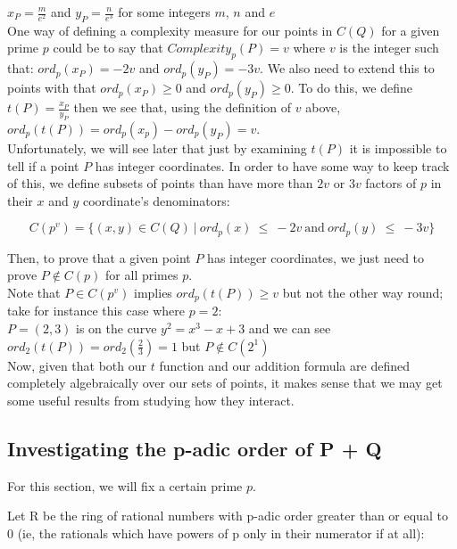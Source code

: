 \documentclass{article}
\begin{document}
$x_P = \frac{m}{e^2}$ \quad and \quad $y_P = \frac{n}{e^3}$ for some integers $m$, $n$ and $e$\\

One way of defining a complexity measure for our points in $C(Q)$ for a given prime $p$ could be to say that $Complexity_p(P) = v$ where $v$ is the integer such that:  $ord_p(x_P) = -2v$ and $ord_p(y_P) = -3v$. We also need to extend this to points with that $ord_p(x_P) \geq 0$ and $ord_p(y_P) \geq 0$. To do this, we define $t(P) = \frac{x_P}{y_P}$ then we see that, using the definition of $v$ above, $ord_p(t(P)) = ord_p(x_p) - ord_p(y_P) = v$. \\ 

Unfortunately, we will see later that just by examining $t(P)$ it is impossible to tell if a point $P$ has integer coordinates. In order to have some way to keep track of this, we define subsets of points than have more than $2v$ or $3v$ factors of $p$ in their $x$ and $y$ coordinate's denominators:

\[ C(p^v) = \{(x, y) \in C(Q) \ | \ ord_p(x) \ \leq \ -2v \ \text{and} \ ord_p(y) \ \leq \ -3v\} \]

Then, to prove that a given point $P$ has integer coordinates, we just need to prove $P \notin C(p)$ for all primes $p$.\\

Note that $P \in C(p^v)$ implies $ord_p(t(P)) \geq v$ but not the other way round; take for instance this case where $p = 2$:\\

$P = (2, 3)$ is on the curve $y^2 = x^3 - x + 3$ and we can see $ord_2(t(P)) = ord_2(\frac{2}{3}) = 1$ but $P \notin C(2^1)$ \\

Now, given that both our $t$ function and our addition formula are defined completely algebraically over our sets of points, it makes sense that we may get some useful results from studying how they interact.

\subsection{Investigating the p-adic order of P + Q}

For this section, we will fix a certain prime $p$.

Let R be the ring of rational numbers with p-adic order greater than or equal to 0 (ie, the rationals which have powers of p only in their numerator if at all):
\end{document}
